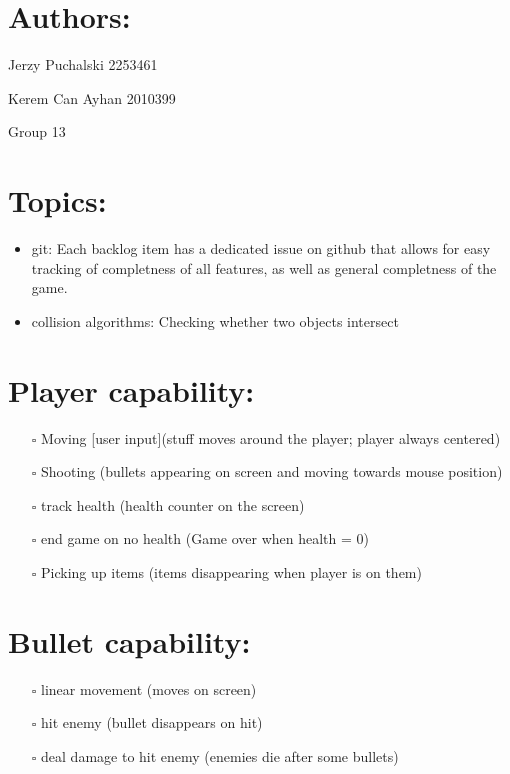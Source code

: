 \documentclass[
]{article}
\author{}
\date{}
\providecommand{\tightlist}{%
  \setlength{\itemsep}{0pt}\setlength{\parskip}{0pt}}
\begin{document}
\section{Authors:}
Jerzy Puchalski 2253461

Kerem Can Ayhan 2010399

Group 13

\section{Topics:}\label{topics}

\begin{itemize}
\tightlist
\item
  git: 
    Each backlog item has a dedicated issue on github that allows for easy tracking of completness of all features, as well as general completness of the game.
\item
  collision algorithms: Checking whether two objects intersect 
\end{itemize}

\section{Player capability:}\label{player-capability}

\begin{itemize}
\tightlist
\item[$\square$]
  Moving {[}user input{]}(stuff moves around the player; player always
  centered)
\item[$\square$]
  Shooting (bullets appearing on screen and moving towards mouse
  position)
\item[$\square$]
  track health (health counter on the screen)
\item[$\square$]
  end game on no health (Game over when health = 0)
\item[$\square$]
  Picking up items (items disappearing when player is on them)
\end{itemize}

\section{Bullet capability:}\label{bullet-capability}

\begin{itemize}
\tightlist
\item[$\square$]
  linear movement (moves on screen)
\item[$\square$]
  hit enemy (bullet disappears on hit)
\item[$\square$]
  deal damage to hit enemy (enemies die after some bullets)
\end{itemize}
\end{document}
